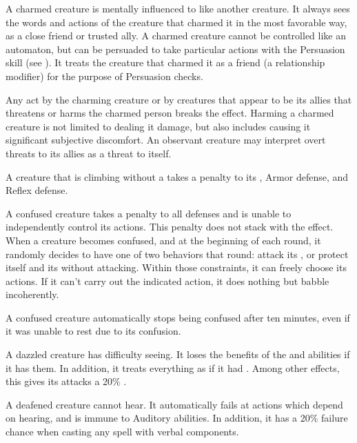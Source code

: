    A charmed creature is mentally influenced to like another creature.
  It always sees the words and actions of the creature that charmed it in the most favorable way, as a close friend or trusted ally.
  A charmed creature cannot be controlled like an automaton, but can be persuaded to take particular actions with the Persuasion skill (see ).
  It treats the creature that charmed it as a friend (a  relationship modifier) for the purpose of Persuasion checks.

  Any act by the charming creature or by creatures that appear to be its allies that threatens or harms the charmed person breaks the effect.
  Harming a charmed creature is not limited to dealing it damage, but also includes causing it significant subjective discomfort.
  An observant creature may interpret overt threats to its allies as a threat to itself.

   A creature that is climbing without a  takes a  penalty to its , Armor defense, and Reflex defense.

   A confused creature takes a  penalty to all defenses and is unable to independently control its actions.
  This penalty does not stack with the \stunned effect.
  When a creature becomes confused, and at the beginning of each round, it randomly decides to have one of two behaviors that round: attack its , or protect itself and its  without attacking.
  Within those constraints, it can freely choose its actions.
  If it can't carry out the indicated action, it does nothing but babble incoherently.

  A confused creature automatically stops being confused after ten minutes, even if it was unable to rest due to its confusion.

   A dazzled creature has difficulty seeing.
  It loses the benefits of the  and  abilities if it has them.
  In addition, it treats everything as if it had .
  Among other effects, this gives its  attacks a 20\% .

   A deafened creature cannot hear.
  It automatically fails at actions which depend on hearing, and is immune to Auditory abilities.
  In addition, it has a 20\% failure chance when casting any spell with verbal components.

